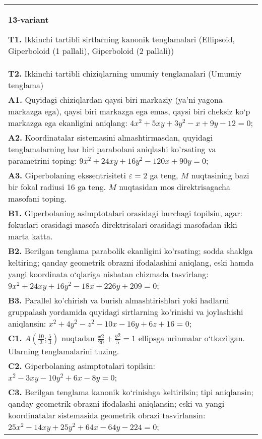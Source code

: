 \documentclass{article}
\begin{document}
\begin{tabular}{m{17cm}}
\textbf{13-variant}
\newline

\textbf{T1.} Ikkinchi tartibli sirtlarning kanonik tenglamalari (Ellipsoid, Giperboloid (1 pallali), Giperboloid (2 pallali)) \\
\textbf{T2.} Ikkinchi tartibli chiziqlarning umumiy tenglamalari (Umumiy tenglama) \\
\textbf{A1.} Quyidagi chiziqlardan qaysi biri markaziy (ya’ni yagona markazga ega), qaysi biri markazga ega emas, qaysi biri cheksiz ko‘p markazga ega ekanligini aniqlang: $4 x^2+5 x y+3 y^2-x+9 y-12=0$; \\
\textbf{A2.} Koordinatalar sistemasini almashtirmasdan, quyidagi tenglamalarning har biri parabolani aniqlashi ko'rsating va parametrini toping: $9 x^2+24 x y+16 y^2-120 x+90 y=0$; \\
\textbf{A3.} Giperbolaning ekssentrisiteti $\varepsilon=2$ ga teng, $M$ nuqtasining bazi bir fokal radiusi 16 ga teng. $M$ nuqtasidan mos direktrisagacha masofani toping. \\
\textbf{B1.} Giperbolaning asimptotalari orasidagi burchagi topilsin, agar: fokuslari orasidagi masofa direktrisalari orasidagi masofadan ikki marta katta. \\
\textbf{B2.} Berilgan tenglama parabolik ekanligini ko'rsating; sodda shaklga keltiring; qanday geometrik obrazni ifodalashini aniqlang, eski hamda yangi koordinata o‘qlariga nisbatan chizmada tasvirlang: $9 x^2+24 x y+16 y^2-18 x+226 y+209=0$; \\
\textbf{B3.} Parallel ko'chirish va burish almashtirishlari yoki hadlarni gruppalash yordamida quyidagi sirtlarning ko'rinishi va joylashishi aniqlansin: $x^2+4 y^2-z^2-10 x-16 y+6 z+16=0$; \\
\textbf{C1.} $A\left(\frac{10}{3}; \frac{5}{3}\right)$ nuqtadan $\frac{x2}{20}+\frac{y2}{5}=1$ ellipsga urinmalar o‘tkazilgan. Ularning tenglamalarini tuzing. \\
\textbf{C2.} Giperbolaning asimptotalari topilsin: $x^2-3 x y-10 y^2+6 x-8 y=0$; \\
\textbf{C3.} Berilgan tenglama kanonik ko‘rinishga keltirilsin; tipi aniqlansin; qanday geometrik obrazni ifodalashi aniqlansin; eski va yangi koordinatalar sistemasida geometrik obrazi tasvirlansin: $25 x^2-14 x y+25 y^2+64 x-64 y-224=0$; \\

\end{tabular}
\vspace{1cm}
\end{document}
